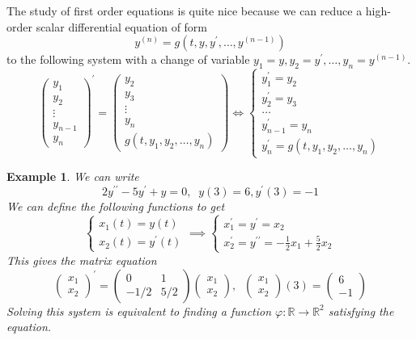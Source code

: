 \documentclass{article}
\newtheorem{example}{Example}[section]
\theoremstyle{remark}
\theoremstyle{definition}
\begin{document}
    The study of first order equations is quite nice because we can reduce a high-order scalar differential equation of form
    \[y^{(n)} = g(t, y, y^\prime, \ldots, y^{(n-1)})\]
    to the following system with a change of variable $y_1 = y, y_2 = y^\prime, \ldots, y_n = y^{(n-1)}$. 
    \[\begin{pmatrix}
    y_1 \\ y_2 \\ \vdots \\ y_{n-1} \\ y_n
    \end{pmatrix}^\prime = \begin{pmatrix}
    y_2 \\ y_3 \\ \vdots \\ y_n \\ g(t, y_1, y_2, \ldots, y_n)
    \end{pmatrix} \iff \begin{cases}
    y_1^\prime = y_2 \\
    y_2^\prime = y_3 \\
    \ldots \\
    y_{n-1}^\prime = y_n \\
    y_n^\prime = g(t, y_1, y_2, \ldots, y_n)
    \end{cases}\]

    \begin{example}
    We can write 
    \[2 y^{\prime\prime} - 5 y^\prime + y = 0, \;\; y(3) = 6, y^\prime (3) = -1\]
    We can define the following functions to get
    \[\begin{cases}
        x_1 (t) = y(t) \\
        x_2 (t) = y^\prime (t) 
    \end{cases} \implies \begin{cases}
    x_1^\prime = y^\prime = x_2 \\
    x_2^\prime = y^{\prime\prime} = -\frac{1}{2} x_1 + \frac{5}{2} x_2
    \end{cases} \]
    This gives the matrix equation
    \[\begin{pmatrix}
    x_1 \\ x_2
    \end{pmatrix}^\prime = \begin{pmatrix}
    0 & 1 \\ -1/2 & 5/2
    \end{pmatrix} \begin{pmatrix}
    x_1 \\ x_2
    \end{pmatrix}, \;\; \begin{pmatrix} x_1 \\ x_2 \end{pmatrix} (3) = \begin{pmatrix} 6 \\ -1 \end{pmatrix}\]
    Solving this system is equivalent to finding a function $\varphi: \mathbb{R} \longrightarrow \mathbb{R}^2$ satisfying the equation. 
    \end{example}  
\end{document}

